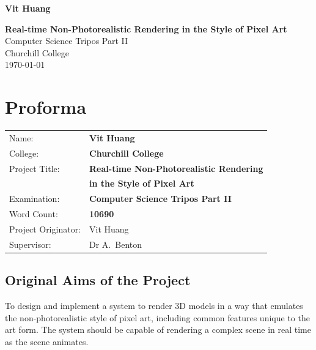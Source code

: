 \documentclass[12pt,twoside,notitlepage]{report}
\begin{document}
\pagestyle{empty}

\hfill{\LARGE \bf Vit Huang}

\vspace*{60mm}
\begin{center}
\Huge
{\bf Real-time Non-Photorealistic Rendering in the Style of Pixel Art} \\
\vspace*{5mm}
Computer Science Tripos Part II \\
\vspace*{5mm}
Churchill College \\
\vspace*{5mm}
\today  %
\end{center}

\cleardoublepage

\setcounter{page}{1}
\pagestyle{plain}

\chapter*{Proforma}

{\large
\begin{tabular}{ll}
Name:               & \bf Vit Huang                       \\
College:            & \bf Churchill College                     \\
Project Title:      & \bf Real-time Non-Photorealistic Rendering \\
					& \bf in the Style of Pixel Art \\
Examination:        & \bf Computer Science Tripos Part II        \\
Word Count:         & \bf 10690 \\
Project Originator: & Vit Huang                    \\
Supervisor:         & Dr A.~Benton                   \\ 
\end{tabular}
}

\section*{Original Aims of the Project}

To design and implement a system to render 3D models in a way that emulates the non-photorealistic style of pixel art, including common features unique to the art form. The system should be capable of rendering a complex scene in real time as the scene animates.
\end{document}

